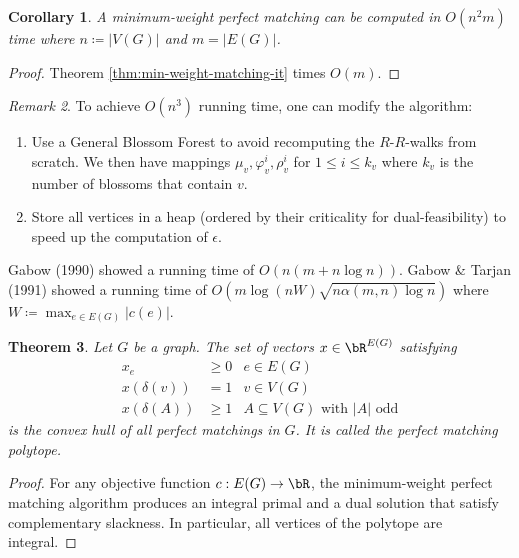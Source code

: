 \documentclass[11pt, a4paper]{article}
\newcommand{\abs}[1]{\left\lvert#1\right\rvert}
\newtheorem{theorem}{Theorem}[section]
\newtheorem{cor}[theorem]{Corollary}
\theoremstyle{remark}
\newtheorem{remark}[theorem]{Remark}
\theoremstyle{definition}
\begin{document}
\begin{cor}
A minimum-weight perfect matching can be computed in $O(n^2m)$ time
where $n\coloneqq\abs{V(G)}$ and $m=\abs{E(G)}$.
\end{cor}
\begin{proof}
Theorem \ref{thm:min-weight-matching-it} times $O(m)$.
\end{proof}

\begin{remark}
To achieve $O(n^3)$ running time, one can modify the algorithm:
\begin{enumerate}
	\item Use a General Blossom Forest to avoid recomputing the $R$-$R$-walks
	from scratch. We then have mappings $\mu_v,\varphi_v^i,\rho_v^i$
	for $1\leq i\leq k_v$ where $k_v$ is the number of blossoms that
	contain $v$.
	
	\item Store all vertices in a heap (ordered by their criticality for
	dual-feasibility) to speed up the computation of $\epsilon$.
\end{enumerate}
Gabow (1990) showed a running time of $O(n(m+n\log n))$. Gabow \& Tarjan
(1991) showed a running time of $O(m\log(nW)\sqrt{n\alpha(m,n)\log n})$
where $W\coloneqq \max_{e\in E(G)}\abs{c(e)}$.
\end{remark}

\begin{theorem}
Let $G$ be a graph. The set of vectors $x\in\bR^{E(G)}$ satisfying
\begin{align*}
	x_e&\geq 0 &e\in E(G) \\
	x(\delta(v))&=1 &v\in V(G) \\
	x(\delta(A))&\geq 1 &A\subseteq V(G)\text{ with $\abs{A}$ odd}
\end{align*}
is the convex hull of all perfect matchings in $G$. It is called the \emph{perfect
matching polytope}.
\end{theorem}
\begin{proof}
For any objective function $c: E(G)\to\bR$, the minimum-weight perfect
matching algorithm produces an integral primal and a dual solution that
satisfy complementary slackness. In particular, all vertices of the
polytope are integral.
\end{proof}
\end{document}
